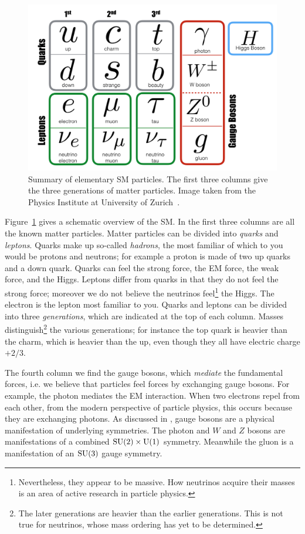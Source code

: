 \begin{figure}
  \centering
  \includegraphics[width=\linewidth]{figs/SM.png}
  \caption{Summary of elementary SM particles. The first three columns give
           the three generations of matter particles. Image taken
           from the Physics Institute at University of
           Zurich~\cite{zurich_SM}.}
  \label{fig:SM}
\end{figure}

Figure~\ref{fig:SM} gives a schematic overview of the SM.
In the first three columns are all the known matter particles.
Matter particles can be divided into {\it quarks}
and {\it leptons}. Quarks make up so-called {\it hadrons},
the most familiar of which to you would be protons and neutrons; for
example a proton is made of two up quarks and a down quark. Quarks can feel the
strong force, the EM force, the weak force, and the Higgs. 
Leptons differ from quarks in that they do not feel the strong force; moreover
we do not believe the neutrinos feel\footnote{Nevertheless, they appear to be
massive. How neutrinos acquire their masses is an area of active research in
particle physics.} the Higgs. The electron is the lepton most
familiar to you. Quarks and leptons can be divided into three
{\it generations}, which are indicated at the top of each column.
Masses distinguish\footnote{The later generations are heavier than the earlier
generations. This is not true for neutrinos, whose mass ordering has yet to be
determined.} the various generations; for instance the top quark is
heavier than the charm, which is heavier than the up, even though they all have
electric charge $+2/3$.

The fourth column we find the gauge bosons, which 
{\it mediate} the fundamental forces, i.e. we believe that particles feel forces
by exchanging gauge bosons. For example, the photon mediates the EM interaction.
When two electrons repel from each other, from the modern perspective of
particle physics, this occurs because they are exchanging photons.
As discussed in , gauge bosons are a physical
manifestation of underlying symmetries. The photon and $W$ and $Z$ bosons
are manifestations of a combined $\operatorname{SU}(2)\times\operatorname{U}(1)$ symmetry. Meanwhile the
gluon is a manifestation of an $\operatorname{SU}(3)$ gauge symmetry.

